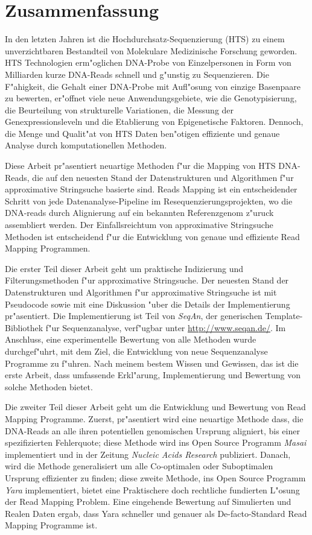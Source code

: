 \section*{Zusammenfassung}
\label{sec:abstract:de}


In den letzten Jahren ist die Hochdurchsatz-Sequenzierung (HTS) zu einem unverzichtbaren Bestandteil von Molekulare Medizinische Forschung geworden. 
HTS Technologien erm"oglichen DNA-Probe von Einzelpersonen in Form von Milliarden kurze DNA-Reads schnell und g"unstig zu Sequenzieren.
Die F"ahigkeit, die Gehalt einer DNA-Probe mit Aufl"osung von einzige Basenpaare zu bewerten, er"offnet viele neue Anwendungsgebiete, wie die Genotypisierung, die Beurteilung von strukturelle Variationen, die Messung der Genexpressionsleveln und die Etablierung von Epigenetische Faktoren.
Dennoch, die Menge und Qualit"at von HTS Daten ben"otigen effiziente und genaue Analyse durch komputationellen Methoden.

Diese Arbeit pr"asentiert neuartige Methoden f"ur die Mapping von HTS DNA-Reads, die auf den neuesten Stand der Datenstrukturen und Algorithmen f"ur approximative Stringsuche basierte sind.
Reads Mapping ist ein entscheidender Schritt von jede Datenanalyse-Pipeline im Resequenzierungsprojekten, wo die DNA-reads durch Alignierung auf ein bekannten Referenzgenom z"uruck assembliert werden.
Der Einfallsreichtum von approximative Stringsuche Methoden ist entscheidend f"ur die Entwicklung von genaue und effiziente Read Mapping Programmen.

Die erster Teil dieser Arbeit geht um praktische Indizierung und Filterungsmethoden f"ur approximative Stringsuche.
Der neuesten Stand der Datenstrukturen und Algorithmen f"ur approximative Stringsuche ist mit Pseudocode sowie mit eine Diskussion "uber die Details der Implementierung pr"asentiert.
Die Implementierung ist Teil von \emph{SeqAn}, der generischen \CC Template-Bibliothek f"ur Sequenzanalyse, verf"ugbar unter \url{http://www.seqan.de/}.
Im Anschluss, eine experimentelle Bewertung von alle Methoden wurde durchgef"uhrt, mit dem Ziel, die Entwicklung von neue Sequenzanalyse Programme zu f"uhren.
Nach meinem bestem Wissen und Gewissen, das ist die erste Arbeit, dass umfassende Erkl"arung, Implementierung und Bewertung von solche Methoden bietet.

Die zweiter Teil dieser Arbeit geht um die Entwicklung und Bewertung von Read Mapping Programme.
Zuerst, pr"asentiert wird eine neuartige Methode dass, die DNA-Reads an alle ihren potentiellen genomischen Ursprung aligniert, bis einer spezifizierten Fehlerquote;
diese Methode wird ins Open Source Programm \emph{Masai} implementiert und in der Zeitung \emph{Nucleic Acids Research} publiziert.
Danach, wird die Methode generalisiert um alle Co-optimalen oder Suboptimalen Ursprung effizienter zu finden;
diese zweite Methode, ins Open Source Programm \emph{Yara} implementiert, bietet eine Praktischere doch rechtliche fundierten L"osung der Read Mapping Problem.
Eine eingehende Bewertung auf Simulierten und Realen Daten ergab, dass Yara schneller und genauer als De-facto-Standard Read Mapping Programme ist.


\newpage
